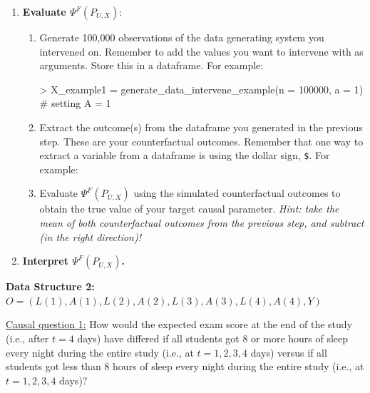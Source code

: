 \documentclass[answers]{exam}
\begin{document}
\begin{enumerate}
\begin{enumerate}
\begin{Schunk}
\end{Schunk}
\end{enumerate}
\item \textbf{Evaluate $\Psi^F(P_{U,X})$}:
\begin{enumerate}
\item Generate 100,000 observations of the data generating system you intervened on. Remember to add the values you want to intervene with as arguments. Store this in a dataframe. For example:
\begin{Schunk}
\begin{Sinput}
> X_example1 = generate_data_intervene_example(n = 100000, a = 1) # setting A = 1
\end{Sinput}
\end{Schunk}
\item Extract the outcome(s) from the dataframe you generated in the previous step. These are your counterfactual outcomes. Remember that one way to extract a variable from a dataframe is using the dollar sign, \texttt{\$}. For example:
\begin{Schunk}
\end{Schunk}
\item Evaluate $\Psi^F(P_{U,X})$ using the simulated counterfactual outcomes to obtain the true value of your target causal parameter. \textit{Hint: take the mean of both counterfactual outcomes from the previous step, and subtract (in the right direction)!}
\end{enumerate}
\item \textbf{Interpret $\Psi^F(P_{U,X})$.}
\end{enumerate}


\noindent\large\textbf{Data Structure 2: $O = (L(1), A(1), L(2), A(2), L(3), A(3), L(4), A(4), Y)$}
\normalsize

\noindent\underline{Causal question 1:} How would the expected exam score at the end of the study (i.e., after $t=4$ days) have differed if all students got 8 or more hours of sleep every night during the entire study (i.e., at $t=1,2,3,4$ days) versus if all students got less than 8 hours of sleep every night during the entire study (i.e., at $t=1,2,3,4$ days)?
\end{document}
